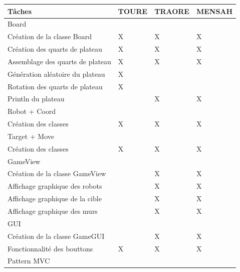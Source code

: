 \documentclass[12pt]{article}
\begin{document}
	\begin{center}
        \begin{tabular}{||p{7cm}|>{\centering\arraybackslash}p{2cm}|>{\centering\arraybackslash}p{2cm}|>{\centering\arraybackslash}p{2cm}||}
            \hline
                Tâches & TOURE & TRAORE & MENSAH\\
            \hline %
                \rowcolor{bluepale} Board  & & &\\
                 Création de la classe Board & X & X & X \\
                 \hline
                 Création des quarts de plateau & X & X & X\\
                 \hline
                 Assemblage des quarts de plateau & X & X & X\\
                 \hline
                 Génération aléatoire du plateau & X & & \\
                 \hline
                 Rotation des quarts de plateau & X & &\\
                 \hline
                 Println  du plateau &  & X & X\\
            \hline %
                \rowcolor{bluepale} Robot + Coord & & &\\
                 Création des classes & X & X & X \\
			\hline %
				\rowcolor{bluepale} Target + Move & & &\\
				Création des classes & X & X & X\\ 
            \hline %
                \rowcolor{bluepale}  GameView & & &\\
                 Création de la classe GameView &  & X & X\\
                \hline
                Affichage graphique des robots & & X & X\\
                \hline
                Affichage graphique de la cible &  & X & X\\ 
				\hline
                Affichage graphique des murs &  & X & X\\
             \hline %
                \rowcolor{bluepale} GUI  & & &\\
                 Création de la classe GameGUI &  & X & X \\
                 \hline
                 Fonctionnalité des bouttons & X & X & X\\
            \hline %
                \rowcolor{bluepale} Pattern MVC & & &\\

\end{tabular}
\end{center}
\end{document}
